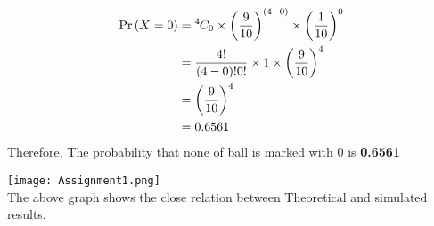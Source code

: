 \documentclass[a4paper]{article}
\providecommand{\pr}[1]{\ensuremath{\Pr\left(#1\right)}}
\newcommand*{\permcomb}[4][0mu]{{{}^{#3}\mkern#1#2_{#4}}}
\newcommand*{\comb}[1][-1mu]{\permcomb[#1]{C}}
\begin{document}
\begin{multicols*}{2}
\begin{align}
\pr{X=0} &= \comb{4}{0} \times \bigg(\frac{9}{10}\bigg)^{(4-0)} \times \bigg(\frac{1}{10}\bigg)^{0} \\
&=\frac{4!}{(4-0)! 0!} \times 1 \times \bigg(\frac{9}{10}\bigg)^{4} \\
&=\bigg( \frac{9}{10}\bigg) ^{4} \\
&= 0.6561
\end{align}
Therefore, The probability that none of ball is marked with $0$ is \textbf{0.6561}

\texttt{[image: Assignment1.png]}\\
 The above graph shows the close relation between Theoretical and simulated results.

\end{multicols*}
\end{document}
